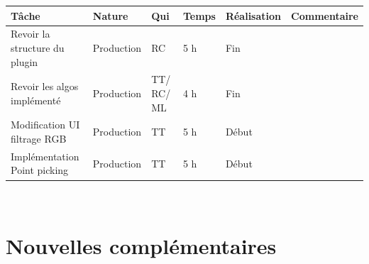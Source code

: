 \documentclass[12pt,titlepage,french]{article}
\begin{document}
\noindent\begin{tabularx}{17cm}{|p{2.5cm}|p{2.5cm}|p{1cm}|p{1.5cm}|p{2.5cm}|X|}
    \hline
    \textbf{Tâche} & \textbf{Nature} & \textbf{Qui} & \textbf{Temps} & \textbf{Réalisation} & \textbf{Commentaire} \\
    \hline
    Revoir la structure du plugin & Production & RC & 5 h & Fin & \\
    \hline
    Revoir les algos implémenté & Production & TT/ RC/ ML & 4 h & Fin & \\
    \hline
    Modification UI filtrage RGB & Production & TT & 5 h & Début & \\
    \hline
    Implémentation Point picking & Production & TT & 5 h & Début & \\
    \hline
\end{tabularx} \\

\section{Nouvelles complémentaires}
\end{document}
